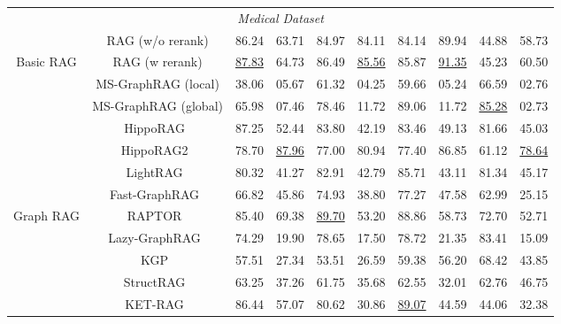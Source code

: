 \documentclass{article} %
\begin{document}
\begin{table}[!h]
{\begin{tabular}{c|c|cc|cc|cc|cc}
\midrule
\multicolumn{10}{c}{\cellcolor[HTML]{EFEFEF}\textit{Medical Dataset}} \\
 & RAG (w/o rerank) & 86.24 & 63.71 & 84.97 & 84.11 & 84.14 & 89.94 & 44.88 & 58.73 \\
\multirow{-2}{*}{Basic RAG} & RAG (w rerank) & \underline{87.83} & 64.73 & 86.49 & \underline{85.56} & 85.87 & \underline{91.35} & 45.23 & 60.50 \\
\midrule
& MS-GraphRAG (local)\citep{edge2024local} & 38.06 & 05.67 & 61.32 & 04.25 & 59.66 & 05.24 & 66.59 & 02.76 \\
 & MS-GraphRAG (global)\citep{edge2024local} & 65.98 & 07.46 & 78.46 & 11.72 & 89.06 & 11.72 & \underline{85.28} & 02.73 \\
 & HippoRAG~\citep{HippoRAG} & 87.25 & 52.44 & 83.80 & 42.19 & 83.46 & 49.13 & 81.66 & 45.03 \\
 & HippoRAG2~\citep{gutiérrez2025HippoRAG2} & 78.70 & \underline{87.96} & 77.00 & 80.94 & 77.40 & 86.85 & 61.12 & \underline{78.64} \\
 & LightRAG~\citep{guo2024lightrag} & 80.32 & 41.27 & 82.91 & 42.79 & 85.71 & 43.11 & 81.34 & 45.17 \\
 & Fast-GraphRAG~\citep{fastgraphrag2024} & 66.82 & 45.86 & 74.93 & 38.80 & 77.27 & 47.58 & 62.99 & 25.15 \\
\multirow{-10}{*}{Graph RAG} & RAPTOR~\citep{sarthi2024raptor} & 85.40 & 69.38 & \underline{89.70} & 53.20 & 88.86 & 58.73 & 72.70 & 52.71 \\
& Lazy-GraphRAG~\citep{LazyGraphRAG} & 74.29 & 19.90 & 78.65 & 17.50 & 78.72 & 21.35 & 83.41 & 15.09 \\
& KGP~\citep{wang2024knowledge} &57.51 & 27.34 &53.51  &26.59  &59.38  &56.20  & 68.42 & 43.85  \\
& StructRAG~\citep{li2024structrag} &63.25 & 37.26 &61.75  &35.68  &62.55  &32.01  & 62.76 & 46.75  \\
 &KET-RAG~\citep{huang2025ket} &86.44 &57.07  &80.62  &30.86  &\underline{89.07}  &44.59  & 44.06 & 32.38  \\
\bottomrule
\end{tabular}
}
\label{tab:appedix-retrieval}
\end{table}
\end{document}

